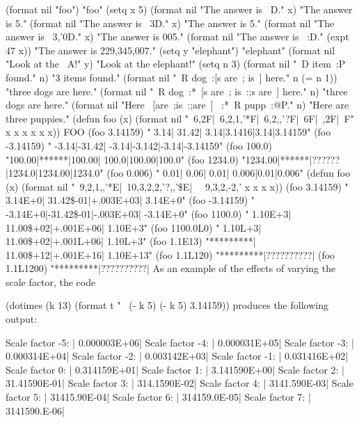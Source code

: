 
\code
 (format nil "foo") \EV "foo"
 (setq x 5) 
 (format nil "The answer is ~D." x) \EV "The answer is 5."
 (format nil "The answer is ~3D." x) \EV "The answer is   5."
 (format nil "The answer is ~3,'0D." x) \EV "The answer is 005."
 (format nil "The answer is ~:D." (expt 47 x))
\EV "The answer is 229,345,007."
 (setq y "elephant") \EV "elephant"
 (format nil "Look at the ~A!" y) \EV "Look at the elephant!"
 (setq n 3) 
 (format nil "~D item~:P found." n) \EV "3 items found."
 (format nil "~R dog~:[s are~; is~] here." n (= n 1))
\EV "three dogs are here."
 (format nil "~R dog~:*~[s are~; is~:;s are~] here." n)
\EV "three dogs are here."
 (format nil "Here ~[are~;is~:;are~] ~:*~R pupp~:@P." n)
\EV "Here are three puppies."
\endcode
\code
 (defun foo (x)
   (format nil "~6,2F|~6,2,1,'*F|~6,2,,'?F|~6F|~,2F|~F"
           x x x x x x)) \EV FOO
 (foo 3.14159)  \EV "  3.14| 31.42|  3.14|3.1416|3.14|3.14159"
 (foo -3.14159) \EV " -3.14|-31.42| -3.14|-3.142|-3.14|-3.14159"
 (foo 100.0)    \EV "100.00|******|100.00| 100.0|100.00|100.0"
 (foo 1234.0)   \EV "1234.00|******|??????|1234.0|1234.00|1234.0"
 (foo 0.006)    \EV "  0.01|  0.06|  0.01| 0.006|0.01|0.006"
\endcode
\code
 (defun foo (x)  
    (format nil
           "~9,2,1,,'*E|~10,3,2,2,'?,,'\$E|~
            ~9,3,2,-2,'%
           x x x x))
 (foo 3.14159)  \EV "  3.14E+0| 31.42\$-01|+.003E+03|  3.14E+0"
 (foo -3.14159) \EV " -3.14E+0|-31.42\$-01|-.003E+03| -3.14E+0"
 (foo 1100.0)   \EV "  1.10E+3| 11.00\$+02|+.001E+06|  1.10E+3"
 (foo 1100.0L0) \EV "  1.10L+3| 11.00\$+02|+.001L+06|  1.10L+3"
 (foo 1.1E13)   \EV "*********| 11.00\$+12|+.001E+16| 1.10E+13"
 (foo 1.1L120)  \EV "*********|??????????|%
 (foo 1.1L1200) \EV "*********|??????????|%
\endcode
As an example of the effects of varying the scale factor, the code

\code
 (dotimes (k 13)
   (format t "~%
           (- k 5) (- k 5) 3.14159))
\endcode
produces the following output:

\code
Scale factor -5: | 0.000003E+06|
Scale factor -4: | 0.000031E+05|
Scale factor -3: | 0.000314E+04|
Scale factor -2: | 0.003142E+03|
Scale factor -1: | 0.031416E+02|
Scale factor  0: | 0.314159E+01|
Scale factor  1: | 3.141590E+00|
Scale factor  2: | 31.41590E-01|
Scale factor  3: | 314.1590E-02|
Scale factor  4: | 3141.590E-03|
Scale factor  5: | 31415.90E-04|
Scale factor  6: | 314159.0E-05|
Scale factor  7: | 3141590.E-06|
\endcode

